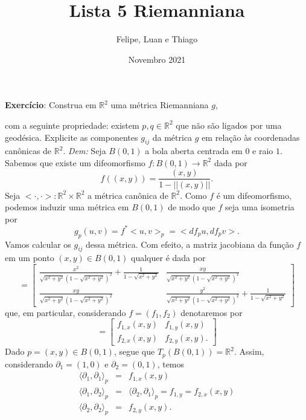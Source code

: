 \documentclass[twoside,openright,titlepage,numbers=noenddot,headinclude,  lineheaders footinclude=true,cleardoublepage=empty,BCOR=5mm,paper=a4,fontsize=12pt ]{scrbook}
\title{Lista 5 Riemanniana}
\author{Felipe, Luan e Thiago}
\date{Novembro 2021}
\newcommand{\R}{\mathbb R}
\begin{document}
\maketitle
\noindent \textbf{Exercício}: Construa em $\R^2$ uma métrica Riemanniana $g$,

com a seguinte propriedade: 
existem $p,q \in \R^2$ que não são ligados por uma geodésica.
Explicite as componentes $g_{ij}$ da métrica $g$ em relação às coordenadas canônicas de $\R^2$.  
\noindent\textit{Dem:} Seja $B(0,1)$ a bola aberta centrada em $0$ e raio $1$.
Sabemos que existe um difeomorfismo $f : B(0, 1) \rightarrow \R^2$ dada por
\begin{equation*}
    f((x, y)) = \frac{(x, y)}{1 - || (x, y)||}.
\end{equation*}
Seja $< \cdot, \cdot > : \R^2 \times \R^2$ a métrica canônica de $\R^2$.
Como $f$ é um difeomorfismo, podemos induzir uma métrica em $B(0, 1)$ de modo que $f$ seja uma isometria por \begin{equation*}
    g_p(u, v) = f^*< u, v >_p = < df_p u, df_p v >.
\end{equation*}
Vamos calcular os $g_{ij}$ dessa métrica. 
Com efeito, a matriz jacobiana da função $f$ em um ponto $(x,y) \in B(0,1)$ qualquer é dada por  
\begin{equation*}
   [df_p]= \begin{bmatrix}
         \frac{x^2}{\sqrt{x^2+y^2}\left(1-\sqrt{x^2+y^2}\right)^2} + \frac{1}{1-\sqrt{x^2+y^2}} & \frac{xy}{\sqrt{x^2+y^2}\left(1-\sqrt{x^2+y^2}\right)^2} \\
         \frac{xy}{\sqrt{x^2+y^2}\left(1-\sqrt{x^2+y^2}\right)^2} & \frac{y^2}{\sqrt{x^2+y^2}\left(1-\sqrt{x^2+y^2}\right)^2} + \frac{1}{1-\sqrt{x^2+y^2}}
    \end{bmatrix}
\end{equation*}
que,
em particular,
considerando $f = (f_1,f_2)$ denotaremos por 
\begin{equation*}
    [df_p]=
    \begin{bmatrix}
         f_{1,x}(x,y) & f_{1,y}(x,y)\\
         f_{2,x}(x,y) & f_{2,y}(x,y).
    \end{bmatrix}
\end{equation*}
Dado $p = (x,y) \in B(0,1)$,
segue que $T_p(B(0,1)) = \R^2$.
Assim,
considerando $\partial_1=(1,0)$ e $\partial_2=(0,1)$,
temos 
\begin{eqnarray*}
    \langle \partial_1,\partial_1 \rangle_p&=&f_{1,x}(x,y)\\
    \langle \partial_1,\partial_2 \rangle_p &=& \langle \partial_2,\partial_1 \rangle_p =f_{1,y} = f_{2,x}(x,y) \\
    \langle \partial_2, \partial_2 \rangle_p&=&f_{2,y}(x,y).  
\end{eqnarray*}
\end{document}
